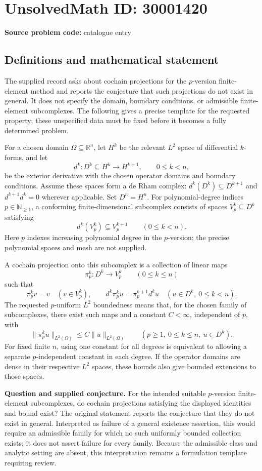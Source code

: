 \documentclass[11pt]{article}
\newcommand{\N}{\mathbb{N}}
\newcommand{\R}{\mathbb{R}}
\begin{document}
\section*{UnsolvedMath ID: 30001420}
\textbf{Source problem code:} catalogue entry
\subsection{Definitions and mathematical statement}
The supplied record asks about cochain projections for the \(p\)-version finite-element method and reports the conjecture that such projections do not exist in general. It does not specify the domain, boundary conditions, or admissible finite-element subcomplexes. The following gives a precise template for the requested property; these unspecified data must be fixed before it becomes a fully determined problem.

For a chosen domain \(\Omega\subseteq\R^n\), let \(H^k\) be the relevant \(L^2\) space of differential \(k\)-forms, and let
\[
 d^k:D^k\subseteq H^k\longrightarrow H^{k+1},\qquad 0\leq k<n,
\]
be the exterior derivative with the chosen operator domains and boundary conditions. Assume these spaces form a de Rham complex: \(d^k(D^k)\subseteq D^{k+1}\) and \(d^{k+1}d^k=0\) wherever applicable. Set \(D^n=H^n\). For polynomial-degree indices \(p\in\N_{\geq1}\), a conforming finite-dimensional subcomplex consists of spaces \(V_p^k\subseteq D^k\) satisfying
\[
 d^k(V_p^k)\subseteq V_p^{k+1}\qquad(0\leq k<n).
\]
Here \(p\) indexes increasing polynomial degree in the \(p\)-version; the precise polynomial spaces and mesh are not supplied.

A cochain projection onto this subcomplex is a collection of linear maps
\[
 \pi_p^k:D^k\longrightarrow V_p^k\qquad(0\leq k\leq n)
\]
such that
\[
 \pi_p^k v=v\quad(v\in V_p^k),\qquad
 d^k\pi_p^k u=\pi_p^{k+1}d^k u\quad(u\in D^k,\ 0\leq k<n).
\]
The requested \(p\)-uniform \(L^2\) boundedness means that, for the chosen family of subcomplexes, there exist such maps and a constant \(C<\infty\), independent of \(p\), with
\[
 \|\pi_p^k u\|_{L^2(\Omega)}\leq C\|u\|_{L^2(\Omega)}
 \qquad
 (p\geq1,\ 0\leq k\leq n,\ u\in D^k).
\]
For fixed finite \(n\), using one constant for all degrees is equivalent to allowing a separate \(p\)-independent constant in each degree. If the operator domains are dense in their respective \(L^2\) spaces, these bounds also give bounded extensions to those spaces.

\textbf{Question and supplied conjecture.} For the intended suitable \(p\)-version finite-element subcomplexes, do cochain projections satisfying the displayed identities and bound exist? The original statement reports the conjecture that they do not exist in general. Interpreted as failure of a general existence assertion, this would require an admissible family for which no such uniformly bounded collection exists; it does not assert failure for every family. Because the admissible class and analytic setting are absent, this interpretation remains a formulation template requiring review.
\end{document}
